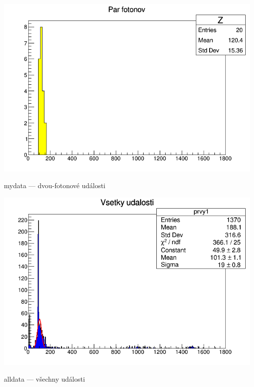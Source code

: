 \begin{graph}[htbp]
\centering
\includegraphics[width=\textwidth-2cm]{graficos/mydataz/c1_n12.png}
\caption{mydata --- dvou-fotonové události}
\label{o:m4}
\end{graph}

\begin{graph}[htbp]
\centering
\includegraphics[width=\textwidth-2cm]{graficos/alldataz/c1.png}
\caption{alldata --- všechny události}
\label{o:a1}
\end{graph}

